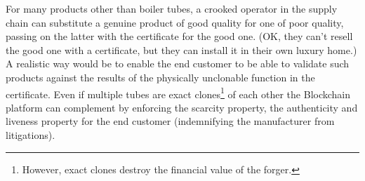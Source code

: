 \documentclass{article}
\begin{document}
For many products other than boiler tubes, a crooked operator in the supply chain can substitute a genuine product of good quality for one of poor quality, passing on the latter with the certificate for the good one. (OK, they can’t resell the good one with a certificate, but they can install it in their own luxury home.) 
A realistic way would be to enable the end customer to be able to validate such products against the results of the physically unclonable function in the certificate. Even if multiple tubes are exact clones\footnote{However, exact clones destroy the financial value of the forger.} of each other 
the Blockchain platform can complement by enforcing the scarcity property, the authenticity and liveness property for the end customer (indemnifying the manufacturer from litigations). 
\end{document}
